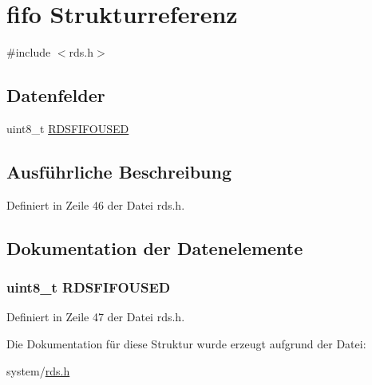 \hypertarget{structfifo}{}\section{fifo Strukturreferenz}
\label{structfifo}


{\ttfamily \#include $<$rds.\+h$>$}

\subsection*{Datenfelder}
\begin{DoxyCompactItemize}
\item 
uint8\+\_\+t \hyperlink{structfifo_a8f4ac68e6765f535c5abca00d2a32a89}{R\+D\+S\+F\+I\+F\+O\+U\+S\+E\+D}
\end{DoxyCompactItemize}


\subsection{Ausführliche Beschreibung}


Definiert in Zeile 46 der Datei rds.\+h.



\subsection{Dokumentation der Datenelemente}
\hypertarget{structfifo_a8f4ac68e6765f535c5abca00d2a32a89}{}
\subsubsection[{R\+D\+S\+F\+I\+F\+O\+U\+S\+E\+D}]{\setlength{\rightskip}{0pt plus 5cm}uint8\+\_\+t R\+D\+S\+F\+I\+F\+O\+U\+S\+E\+D}\label{structfifo_a8f4ac68e6765f535c5abca00d2a32a89}


Definiert in Zeile 47 der Datei rds.\+h.



Die Dokumentation für diese Struktur wurde erzeugt aufgrund der Datei\+:\begin{DoxyCompactItemize}
\item 
system/\hyperlink{rds_8h}{rds.\+h}\end{DoxyCompactItemize}
